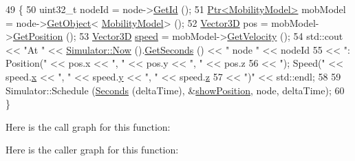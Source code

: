\begin{DoxyCode}
49 \{
50   uint32\_t nodeId = node->\hyperlink{classns3_1_1Node_aaf49b64a843565ce3812326313b370ac}{GetId} ();
51   \hyperlink{classns3_1_1Ptr}{Ptr<MobilityModel>} mobModel = node->\hyperlink{classns3_1_1Object_a13e18c00017096c8381eb651d5bd0783}{GetObject}<
      \hyperlink{classns3_1_1MobilityModel}{MobilityModel}> ();
52   \hyperlink{classns3_1_1Vector3D}{Vector3D} pos = mobModel->\hyperlink{classns3_1_1MobilityModel_aba838f06ec5bbb2d193d94b8c0e4abb4}{GetPosition} ();
53   \hyperlink{classns3_1_1Vector3D}{Vector3D} \hyperlink{mmwave-amc-test_8cc_a6dc6e6f3c75c509ce943163afb5dade7}{speed} = mobModel->\hyperlink{classns3_1_1MobilityModel_a77004c56b45773bf57bdd3750887ced3}{GetVelocity} ();
54   std::cout << \textcolor{stringliteral}{"At "} << \hyperlink{group__simulator_gac3635e2e87f7ce316c89290ee1b01d0d}{Simulator::Now} ().\hyperlink{classns3_1_1Time_a8f20d5c3b0902d7b4320982f340b57c8}{GetSeconds} () << \textcolor{stringliteral}{" node "} << nodeId
55             << \textcolor{stringliteral}{": Position("} << pos.x << \textcolor{stringliteral}{", "} << pos.y << \textcolor{stringliteral}{", "} << pos.z
56             << \textcolor{stringliteral}{");   Speed("} << speed.\hyperlink{classns3_1_1Vector3D_a59dbc5dc984a4fea2819e042d2d6109c}{x} << \textcolor{stringliteral}{", "} << speed.\hyperlink{classns3_1_1Vector3D_ae679257823406b2e008be04316e4245f}{y} << \textcolor{stringliteral}{", "} << speed.\hyperlink{classns3_1_1Vector3D_ac31aba8cd85d66f8cf52e4b4c313f415}{z}
57             << \textcolor{stringliteral}{")"} << std::endl;
58 
59   Simulator::Schedule (\hyperlink{group__timecivil_ga33c34b816f8ff6628e33d5c8e9713b9e}{Seconds} (deltaTime), &\hyperlink{bonnmotion-ns2-example_8cc_aa58f33caf8bba45b2f1d495586580172}{showPosition}, node, deltaTime);
60 \}
\end{DoxyCode}


Here is the call graph for this function\+:




Here is the caller graph for this function\+:


